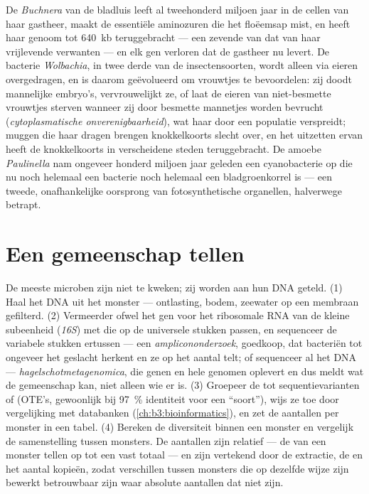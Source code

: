 \begin{example}\label{ex:b3:microbiomes:obligate}
De \emph{Buchnera} van de bladluis leeft al tweehonderd miljoen jaar in
de cellen van haar gastheer, maakt de essentiële aminozuren die het
floëemsap mist, en heeft haar genoom tot \qty{640}{kb} teruggebracht
--- een zevende van dat van haar vrijlevende verwanten --- en elk gen
verloren dat de gastheer nu levert. De bacterie \emph{Wolbachia}, in
twee derde van de insectensoorten, wordt alleen via eieren
overgedragen, en is daarom geëvolueerd om vrouwtjes te bevoordelen:
zij doodt mannelijke embryo's, vervrouwelijkt ze, of laat de eieren
van niet-besmette vrouwtjes sterven wanneer zij door besmette
mannetjes worden bevrucht (\emph{cytoplasmatische onverenigbaarheid}),
wat haar door een populatie verspreidt; muggen die haar dragen brengen
knokkelkoorts slecht over, en het uitzetten ervan heeft de
knokkelkoorts in verscheidene steden teruggebracht. De amoebe
\emph{Paulinella} nam ongeveer honderd miljoen jaar geleden een
cyanobacterie op die nu noch helemaal een bacterie noch helemaal een
bladgroenkorrel is --- een tweede, onafhankelijke oorsprong van
fotosynthetische organellen, halverwege betrapt.
\end{example}

\section{Een gemeenschap tellen}

\begin{method}\label{met:b3:microbiomes:16s}
De meeste microben zijn niet te kweken; zij worden aan hun DNA geteld.
(1) Haal het DNA uit het monster --- ontlasting, bodem, zeewater op een
membraan gefilterd. (2) Vermeerder ofwel het gen voor het ribosomale
RNA van de kleine subeenheid (\emph{16S}) met  die op de
universele stukken passen, en sequenceer de variabele stukken ertussen
--- een \emph{amplicononderzoek}, goedkoop, dat bacteriën tot ongeveer
het geslacht herkent en ze op het aantal  telt; of sequenceer al
het DNA --- \emph{hagelschotmetagenomica}, die genen en hele genomen
oplevert en dus meldt wat de gemeenschap kan, niet alleen wie er is.
(3) Groepeer de  tot sequentievarianten of \emph{} (OTE's, gewoonlijk bij \qty{97}{\%} identiteit
voor een ``soort''), wijs ze toe door vergelijking met databanken
(\cref{ch:b3:bioinformatics}), en zet de aantallen per monster in een
tabel. (4) Bereken de diversiteit binnen een monster en vergelijk de
samenstelling tussen monsters. De aantallen zijn relatief --- de 
van een monster tellen op tot een vast totaal --- en zijn vertekend
door de extractie, de  en het aantal kopieën, zodat verschillen
tussen monsters die op dezelfde wijze zijn bewerkt betrouwbaar zijn
waar absolute aantallen dat niet zijn.
\end{method}

